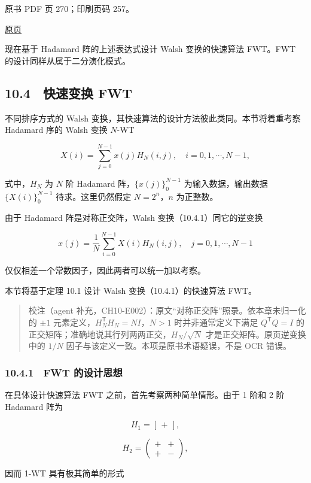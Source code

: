 原书 PDF 页 270；印刷页码 257。

\href{source-images/pdf-270.jpeg}{原页}

现在基于 Hadamard 阵的上述表达式设计 Walsh 变换的快速算法 FWT。FWT 的设计同样从属于二分演化模式。

\subsection{10.4　快速变换 FWT}\label{ch10-ux5febux901fux53d8ux6362-fwt}

不同排序方式的 Walsh 变换，其快速算法的设计方法彼此类同。本节将着重考察 Hadamard 序的 Walsh 变换 \(N\)-WT

\[
X(i)=\sum_{j=0}^{N-1}x(j)H_N(i,j),\quad i=0,1,\cdots,N-1,
\tag{10.4.1}
\]

式中，\(H_N\) 为 \(N\) 阶 Hadamard 阵，\(\{x(j)\}_0^{N-1}\) 为输入数据，输出数据 \(\{X(i)\}_0^{N-1}\) 待求。这里仍然假定 \(N=2^n\)，\(n\) 为正整数。

由于 Hadamard 阵是对称正交阵，Walsh 变换（10.4.1）同它的逆变换

\[
x(j)=\frac1N\sum_{i=0}^{N-1}X(i)H_N(i,j),\quad j=0,1,\cdots,N-1
\]

仅仅相差一个常数因子，因此两者可以统一加以考察。

本节将基于定理 10.1 设计 Walsh 变换（10.4.1）的快速算法 FWT。

\begin{quote}
校注（agent 补充，CH10-E002）：原文``对称正交阵''照录。依本章未归一化的 \(\pm1\) 元素定义，\(H_N^\mathsf{T}H_N=NI\)，\(N>1\) 时并非通常定义下满足 \(Q^\mathsf{T}Q=I\) 的正交矩阵；准确地说其行列两两正交，\(H_N/\sqrt N\) 才是正交矩阵。原页逆变换中的 \(1/N\) 因子与该定义一致。本项是原书术语疑误，不是 OCR 错误。
\end{quote}

\subsubsection{10.4.1　FWT 的设计思想}\label{ch10-fwt-ux7684ux8bbeux8ba1ux601dux60f3}

在具体设计快速算法 FWT 之前，首先考察两种简单情形。由于 1 阶和 2 阶 Hadamard 阵为

\[
H_1=[\,+\,],
\]

\[
H_2=\begin{pmatrix}+&+\\+&-\end{pmatrix},
\]

因而 1-WT 具有极其简单的形式


